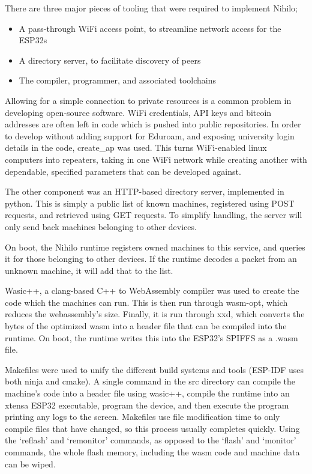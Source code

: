 \documentclass{article}
\begin{document}
There are three major pieces of tooling that were required to implement Nihilo;
\begin{itemize}
\item A pass-through WiFi access point, to streamline network access for the ESP32s
\item A directory server, to facilitate discovery of peers
\item The compiler, programmer, and associated toolchains
\end{itemize}

Allowing for a simple connection to private resources is a common problem in developing open-source software. WiFi credentials, API keys and bitcoin addresses are often left in code which is pushed into public repositories. In order to develop without adding support for Eduroam, and exposing university login details in the code, create\_ap \cite{createap}  was used. This turns WiFi-enabled linux computers into repeaters, taking in one WiFi network while creating another with dependable, specified parameters that can be developed against.

The other component was an HTTP-based directory server, implemented in python. This is simply a public list of known machines, registered using POST requests, and retrieved using GET requests. To simplify handling, the server will only send back machines belonging to other devices. 

On boot, the Nihilo runtime registers owned machines to this service, and queries it for those belonging to other devices. If the runtime decodes a packet from an unknown machine, it will add that to the list.

Wasic++, a clang-based C++ to WebAssembly compiler was used to create the code which the machines can run. This is then run through wasm-opt, which reduces the webassembly's size. Finally, it is run through xxd, which converts the bytes of the optimized wasm into a header file that can be compiled into the runtime. On boot, the runtime writes this into the ESP32's SPIFFS as a .wasm file.

Makefiles were used to unify the different build systems and tools (ESP-IDF uses both ninja and cmake). A single command in the src directory can compile the machine's code into a header file using wasic++, compile the runtime into an xtensa ESP32 executable, program the device, and then execute the program printing any logs to the screen. Makefiles use file modification time to only compile files that have changed, so this process usually completes quickly. Using the `reflash' and `remonitor' commands, as opposed to the `flash' and `monitor' commands, the whole flash memory, including the wasm code and machine data can be wiped.
\end{document}
